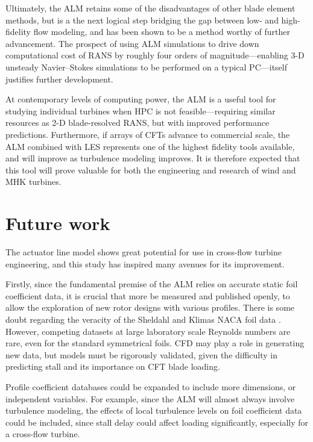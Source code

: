 \documentclass[times]{weauth}
\begin{document}
Ultimately, the ALM retains some of the disadvantages of other blade element
methods, but is a the next logical step bridging the gap between low- and
high-fidelity flow modeling, and has been shown to be a method worthy of further
advancement. The prospect of using ALM simulations to drive down computational
cost of RANS by roughly four orders of magnitude---enabling 3-D unsteady
Navier--Stokes simulations to be performed on a typical PC---itself justifies
further development.

At contemporary levels of computing power, the ALM is a useful tool for studying
individual turbines when HPC is not feasible---requiring similar resources as
2-D blade-resolved RANS, but with improved performance predictions. Furthermore,
if arrays of CFTs advance to commercial scale, the ALM combined with LES
represents one of the highest fidelity tools available, and will improve as
turbulence modeling improves. It is therefore expected that this tool will prove
valuable for both the engineering and research of wind and MHK turbines.


\section{Future work}

The actuator line model shows great potential for use in cross-flow turbine
engineering, and this study has inspired many avenues for its improvement.

Firstly, since the fundamental premise of the ALM relies on accurate static foil
coefficient data, it is crucial that more be measured and published openly, to
allow the exploration of new rotor designs with various profiles. There is some
doubt regarding the veracity of the Sheldahl and Klimas NACA foil data
\cite{Bedon2014}. However, competing datasets at large laboratory scale Reynolds
numbers are rare, even for the standard symmetrical foils. CFD may play a role
in generating new data, but models must be rigorously validated, given the
difficulty in predicting stall and its importance on CFT blade loading.

Profile coefficient databases could be expanded to include more dimensions, or
independent variables. For example, since the ALM will almost always involve
turbulence modeling, the effects of local turbulence levels on foil coefficient
data could be included, since stall delay could affect loading significantly,
especially for a cross-flow turbine.
\end{document}
